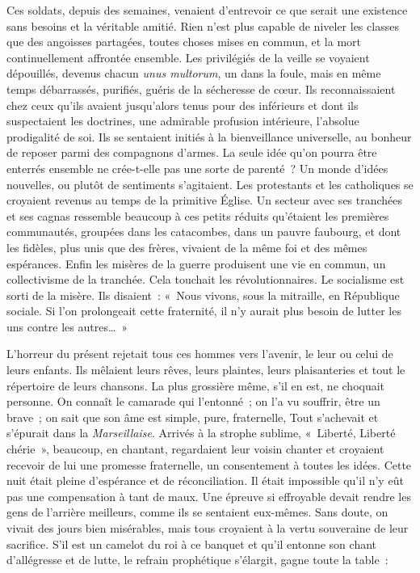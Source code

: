 \documentclass[french,twoside]{book} %
\begin{document}
Ces soldats, depuis des semaines, venaient d’entrevoir ce que serait une existence sans besoins et la véritable amitié. Rien n’est plus capable de niveler les classes que des angoisses partagées, toutes choses mises en commun, et la mort continuellement affrontée ensemble. Les privilégiés de la veille se voyaient dépouillés, devenus chacun {\itshape unus multorum}, un dans la foule, mais en même temps débarrassés, purifiés, guéris de la sécheresse de cœur. Ils reconnaissaient chez ceux qu’ils avaient jusqu’alors tenus pour des inférieurs et dont ils suspectaient les doctrines, une admirable profusion intérieure, l’absolue prodigalité de soi. Ils se sentaient initiés à la bienveillance universelle, au bonheur de reposer parmi des compagnons d’armes. La seule idée qu’on pourra être enterrés ensemble ne crée-t-elle pas une sorte de parenté ? Un monde d’idées nouvelles, ou plutôt de sentiments s’agitaient. Les protestants et les catholiques se croyaient revenus au temps de la primitive Église. Un secteur avec ses tranchées et ses cagnas ressemble beaucoup à ces petits réduits qu’étaient les premières communautés, groupées dans les catacombes, dans un pauvre faubourg, et dont les fidèles, plus unis que des frères, vivaient de la même foi et des mêmes espérances. Enfin les misères de la guerre produisent une vie en commun, un collectivisme de la tranchée. Cela touchait les révolutionnaires. Le socialisme est sorti de la misère. Ils disaient : « Nous vivons, sous la mitraille, en République sociale. Si l’on prolongeait cette fraternité, il n’y aurait plus besoin de lutter les uns contre les autres… »‌\par
L’horreur du présent rejetait tous ces hommes vers l’avenir, le leur ou celui de leurs enfants. Ils mêlaient leurs rêves, leurs plaintes, leurs plaisanteries et tout le répertoire de leurs chansons. La plus grossière même, s’il en est, ne choquait personne. On connaît le camarade qui l’entonné ; on l’a vu souffrir, être un brave ; on sait que son âme est simple, pure, fraternelle, Tout s’achevait et s’épurait dans la {\itshape Marseillaise}. Arrivés à la strophe sublime, « Liberté, Liberté chérie », beaucoup, en chantant, regardaient leur voisin chanter et croyaient recevoir de lui une promesse fraternelle, un consentement à toutes les idées. Cette nuit était pleine d’espérance et de réconciliation. Il était impossible qu’il n’y eût pas une compensation à tant de maux. Une épreuve si effroyable devait rendre les gens de l’arrière meilleurs, comme ils se sentaient eux-mêmes. Sans doute, on vivait des jours bien misérables, mais tous croyaient à la vertu souveraine de leur sacrifice. S’il est un camelot du roi à ce banquet et qu’il entonne son chant d’allégresse et de lutte, le refrain prophétique s’élargit, gagne toute la table :‌\par
\end{document}
